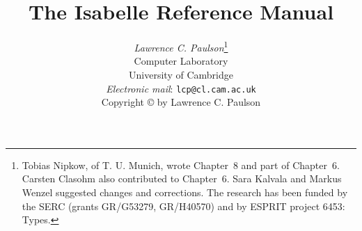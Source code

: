 \title{The Isabelle Reference Manual}

\author{{\em Lawrence C. Paulson}\thanks
{Tobias Nipkow, of T. U. Munich, wrote Chapter~8 and part of Chapter~6.
 Carsten Clasohm also contributed to Chapter~6.
 Sara Kalvala and Markus Wenzel suggested changes and corrections.
 The research has been funded by the SERC (grants GR/G53279, GR/H40570)
  and by ESPRIT project 6453: Types.} 
\\  
        Computer Laboratory \\ University of Cambridge \\[2ex]
        {\small{\em Electronic mail\/}: {\tt lcp@cl.cam.ac.uk}} \\[3cm]
    {\small Copyright \copyright{} \number\year{} by Lawrence C. Paulson}
}
\date{} 
\makeindex

\underscoreoff

\setcounter{secnumdepth}{1} \setcounter{tocdepth}{2}

\pagestyle{headings}
\sloppy
\binperiod     %



\maketitle 
{} \tableofcontents \clearfirst












\begingroup
   \small\raggedright\frenchspacing
  
\endgroup


